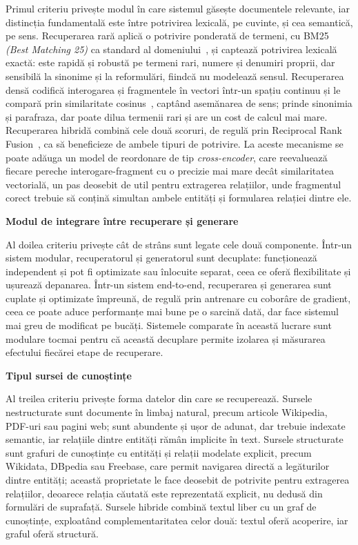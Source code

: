 Primul criteriu privește modul în care sistemul găsește documentele relevante, iar distincția fundamentală este între potrivirea lexicală, pe cuvinte, și cea semantică, pe sens. Recuperarea rară aplică o potrivire ponderată de termeni, cu BM25 \textit{(Best Matching 25)} ca standard al domeniului~\cite{robertson2009bm25}, și captează potrivirea lexicală exactă: este rapidă și robustă pe termeni rari, numere și denumiri proprii, dar sensibilă la sinonime și la reformulări, fiindcă nu modelează sensul. Recuperarea densă codifică interogarea și fragmentele în vectori într-un spațiu continuu și le compară prin similaritate cosinus~\cite{karpukhin2020dpr}, captând asemănarea de sens; prinde sinonimia și parafraza, dar poate dilua termenii rari și are un cost de calcul mai mare. Recuperarea hibridă combină cele două scoruri, de regulă prin Reciprocal Rank Fusion~\cite{cormack2009rrf}, ca să beneficieze de ambele tipuri de potrivire. La aceste mecanisme se poate adăuga un model de reordonare de tip \textit{cross-encoder}, care reevaluează fiecare pereche interogare-fragment cu o precizie mai mare decât similaritatea vectorială, un pas deosebit de util pentru extragerea relațiilor, unde fragmentul corect trebuie să conțină simultan ambele entități și formularea relației dintre ele.

\textbf{Modul de integrare între recuperare și generare}

Al doilea criteriu privește cât de strâns sunt legate cele două componente. Într-un sistem modular, recuperatorul și generatorul sunt decuplate: funcționează independent și pot fi optimizate sau înlocuite separat, ceea ce oferă flexibilitate și ușurează depanarea. Într-un sistem end-to-end, recuperarea și generarea sunt cuplate și optimizate împreună, de regulă prin antrenare cu coborâre de gradient, ceea ce poate aduce performanțe mai bune pe o sarcină dată, dar face sistemul mai greu de modificat pe bucăți. Sistemele comparate în această lucrare sunt modulare tocmai pentru că această decuplare permite izolarea și măsurarea efectului fiecărei etape de recuperare.

\textbf{Tipul sursei de cunoștințe}

Al treilea criteriu privește forma datelor din care se recuperează. Sursele nestructurate sunt documente în limbaj natural, precum articole Wikipedia, PDF-uri sau pagini web; sunt abundente și ușor de adunat, dar trebuie indexate semantic, iar relațiile dintre entități rămân implicite în text. Sursele structurate sunt grafuri de cunoștințe cu entități și relații modelate explicit, precum Wikidata, DBpedia sau Freebase, care permit navigarea directă a legăturilor dintre entități; această proprietate le face deosebit de potrivite pentru extragerea relațiilor, deoarece relația căutată este reprezentată explicit, nu dedusă din formulări de suprafață. Sursele hibride combină textul liber cu un graf de cunoștințe, exploatând complementaritatea celor două: textul oferă acoperire, iar graful oferă structură.

